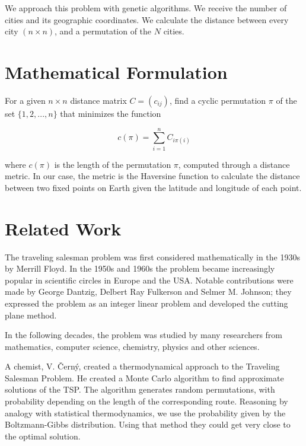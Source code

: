 \documentclass[twoside,twocolumn]{article}
\begin{document}
We approach this problem with genetic algorithms. We receive the number of cities and its geographic coordinates. We calculate the distance between every city $(n \times n)$, and a permutation of the $N$ cities.\linebreak


\section{Mathematical Formulation}

For a given $n \times n$ distance matrix $C = (c_{ij})$, find a cyclic permutation $\pi$ of the set $\{1, 2, ..., n\}$ that minimizes the function

\begin{equation}
c(\pi) = \sum_{i=1}^{n} C_{i\pi(i)}
\end{equation}

where $c(\pi)$ is the length of the permutation $\pi$, computed through a distance metric. In our case, the metric is the Haversine function to calculate the distance between two fixed points on Earth given the latitude and longitude of each point.

\section{Related Work}

The traveling salesman problem was first considered mathematically in the 1930s by Merrill Floyd. In the 1950s and 1960s the problem became increasingly popular in scientific circles in Europe and the USA. Notable contributions were made by George Dantzig, Delbert Ray Fulkerson and Selmer M. Johnson; they expressed the problem as an integer linear problem and developed the cutting plane method.\linebreak

In the following decades, the problem was studied by many researchers from mathematics, computer science, chemistry, physics and other sciences.\linebreak

A chemist, V. Černý, created a thermodynamical approach to the Traveling Salesman Problem. He created a Monte Carlo algorithm to find approximate solutions of the TSP. The algorithm generates random permutations, with probability depending on the length of the corresponding route. Reasoning by analogy with statistical thermodynamics, we use the probability given by the Boltzmann-Gibbs distribution. Using that method they could get very close to the optimal solution.\linebreak
\end{document}
